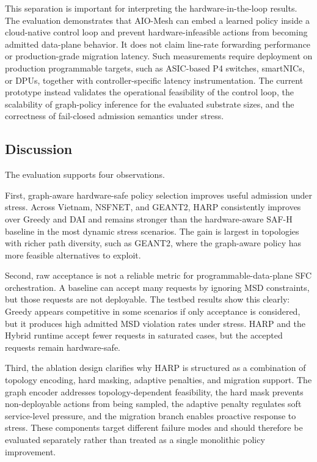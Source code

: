 \documentclass[final,5p]{elsarticle}
\begin{document}
This separation is important for interpreting the hardware-in-the-loop results. The evaluation demonstrates that AIO-Mesh can embed a learned policy inside a cloud-native control loop and prevent hardware-infeasible actions from becoming admitted data-plane behavior. It does not claim line-rate forwarding performance or production-grade migration latency. Such measurements require deployment on production programmable targets, such as ASIC-based P4 switches, smartNICs, or DPUs, together with controller-specific latency instrumentation. The current prototype instead validates the operational feasibility of the control loop, the scalability of graph-policy inference for the evaluated substrate sizes, and the correctness of fail-closed admission semantics under stress.


\subsection{Discussion}
\label{subsec:evaluation_discussion}

The evaluation supports four observations.

First, graph-aware hardware-safe policy selection improves useful admission under stress. Across Vietnam, NSFNET, and GEANT2, HARP consistently improves over Greedy and DAI and remains stronger than the hardware-aware SAF-H baseline in the most dynamic stress scenarios. The gain is largest in topologies with richer path diversity, such as GEANT2, where the graph-aware policy has more feasible alternatives to exploit.

Second, raw acceptance is not a reliable metric for programmable-data-plane SFC orchestration. A baseline can accept many requests by ignoring MSD constraints, but those requests are not deployable. The testbed results show this clearly: Greedy appears competitive in some scenarios if only acceptance is considered, but it produces high admitted MSD violation rates under stress. HARP and the Hybrid runtime accept fewer requests in saturated cases, but the accepted requests remain hardware-safe.

Third, the ablation design clarifies why HARP is structured as a combination of topology encoding, hard masking, adaptive penalties, and migration support. The graph encoder addresses topology-dependent feasibility, the hard mask prevents non-deployable actions from being sampled, the adaptive penalty regulates soft service-level pressure, and the migration branch enables proactive response to stress. These components target different failure modes and should therefore be evaluated separately rather than treated as a single monolithic policy improvement.
\end{document}
